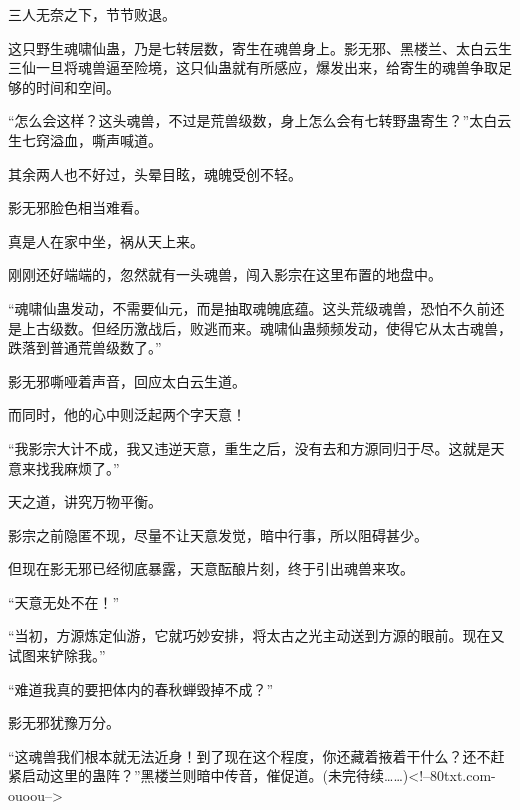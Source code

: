 \begin{this_body}
三人无奈之下，节节败退。

这只野生魂啸仙蛊，乃是七转层数，寄生在魂兽身上。影无邪、黑楼兰、太白云生三仙一旦将魂兽逼至险境，这只仙蛊就有所感应，爆发出来，给寄生的魂兽争取足够的时间和空间。

“怎么会这样？这头魂兽，不过是荒兽级数，身上怎么会有七转野蛊寄生？”太白云生七窍溢血，嘶声喊道。

其余两人也不好过，头晕目眩，魂魄受创不轻。

影无邪脸色相当难看。

真是人在家中坐，祸从天上来。

刚刚还好端端的，忽然就有一头魂兽，闯入影宗在这里布置的地盘中。

“魂啸仙蛊发动，不需要仙元，而是抽取魂魄底蕴。这头荒级魂兽，恐怕不久前还是上古级数。但经历激战后，败逃而来。魂啸仙蛊频频发动，使得它从太古魂兽，跌落到普通荒兽级数了。”

影无邪嘶哑着声音，回应太白云生道。

而同时，他的心中则泛起两个字天意！

“我影宗大计不成，我又违逆天意，重生之后，没有去和方源同归于尽。这就是天意来找我麻烦了。”

天之道，讲究万物平衡。

影宗之前隐匿不现，尽量不让天意发觉，暗中行事，所以阻碍甚少。

但现在影无邪已经彻底暴露，天意酝酿片刻，终于引出魂兽来攻。

“天意无处不在！”

“当初，方源炼定仙游，它就巧妙安排，将太古之光主动送到方源的眼前。现在又试图来铲除我。”

“难道我真的要把体内的春秋蝉毁掉不成？”

影无邪犹豫万分。

“这魂兽我们根本就无法近身！到了现在这个程度，你还藏着掖着干什么？还不赶紧启动这里的蛊阵？”黑楼兰则暗中传音，催促道。(未完待续……)<!--80txt.com-ouoou-->

\end{this_body}


